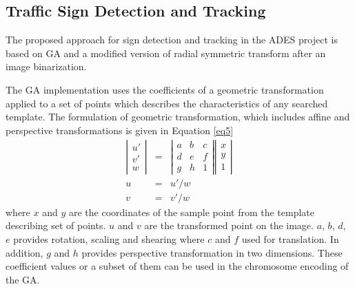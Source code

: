 \documentclass[a4paper,oneside,12pt]{report}
\begin{document}
\subsection{Traffic Sign Detection and Tracking}
The proposed approach for sign detection and tracking in the ADES project is based on GA and a modified version of radial symmetric transform after an image binarization. 

The GA implementation uses the coefficients of a geometric transformation applied to a set of points which describes the characteristics of any searched template. The formulation of geometric transformation, which includes affine and perspective transformations is given in Equation \ref{eq5}
\begin{eqnarray}
\label{eq5}
\left| \begin{array}{ccc} u' \\ v' \\ w \end{array} \right| &=& 
\left| \begin{array}{ccc} a & b & c \\ d & e & f \\ g & h & 1 \end{array} \right| \left| \begin{array}{ccc} x \\ y \\ 1 \end{array} \right| \\
\nonumber u &=& u'/w \\
\nonumber v &=& v'/w 
\end{eqnarray}
\noindent where $x$ and $y$ are the coordinates of the sample point from the template describing set of points. $u$ and $v$ are the transformed point on the image. $a$, $b$, $d$, $e$  provides rotation, scaling and shearing where $c$ and $f$ used for translation. In addition, $g$ and $h$ provides perspective transformation in two dimensions. These coefficient values or a subset of them can be used in the chromosome encoding of the GA.
\end{document}
